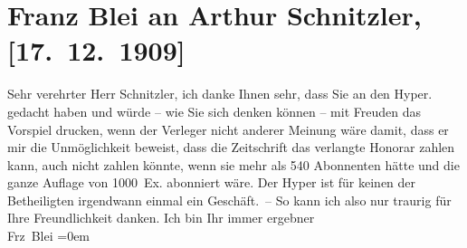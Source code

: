 

         
         \renewcommand{\erwaehntePersonen}{Personen: Franz Blei, Hans von Weber}
         \renewcommand{\erwaehnteInstitutionen}{Institutionen: Hyperion}
         \renewcommand{\erwaehnteOrte}{Orte: München, Wien}
         \renewcommand{\erwaehnteWerke}{Werke: Der junge Medardus. Dramatische Historie in einem Vorspiel und fünf Aufzügen}
               \section[Franz Blei an Arthur Schnitzler, {[}17. 12. 1909{]}]{ Franz Blei an Arthur Schnitzler, {[}17. 12. 1909{]}}\nopagebreak{}\rehead{ }\begin{ledgroupsized}[t]{13cm}\normalsize\beginnumbering{} \toendnotes[C]{\smallbreak\pagebreak[2]} 
\toendnotes[C]{\smallbreak}\pstart{}{\pb}Sehr verehrter Herr
                  Schnitzler,\pend\pstart
           ich danke Ihnen sehr, dass Sie an den Hyper.
               gedacht haben und würde – wie Sie sich denken können – mit Freuden das Vorspiel drucken, wenn der Verleger nicht anderer Meinung
               wäre damit, dass er mir die Unmöglichkeit beweist, dass die Zeitschrift das verlangte
               Honorar zahlen kann, auch nicht zahlen könnte, wenn sie mehr als 540 Abonnenten hätte
               und die ganze Auflage von 1000 Ex. abonniert wäre. Der Hyper ist für keinen der Betheiligten irgendwann einmal ein Geschäft. – So
               kann ich also nur traurig für Ihre Freundlichkeit danken.\pend
           \pstart
           Ich bin Ihr immer ergebner{\\[\baselineskip]}\spacefill\mbox{Frz Blei}\pend
           \leftskip=0em{}
         
         \endnumbering{}\end{ledgroupsized}  \newcommand{\dateiname}{L01905}\newcommand{\titel}{Franz Blei an Arthur Schnitzler, [17. 12. 1909]}\newcommand{\editorInnen}{Martin Anton Müller und Gerd-Hermann Susen}
      